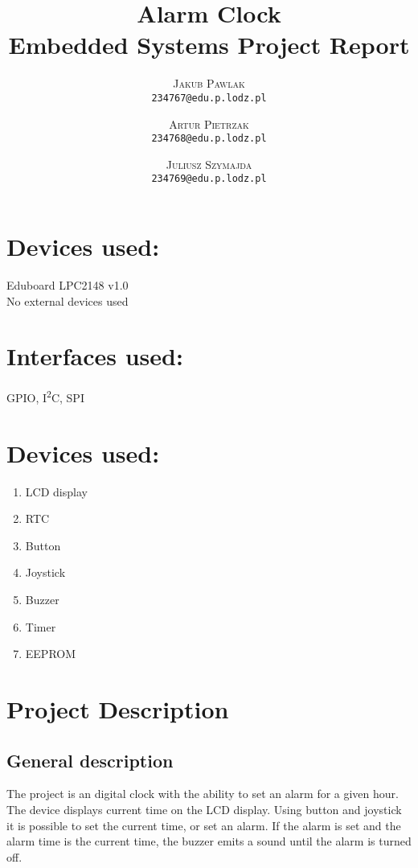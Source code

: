 \documentclass[10pt]{article}
\title{\huge\bf\vspace{-1em} Alarm Clock \\ Embedded Systems Project Report\\\vspace{2em}{\large\normalfont Monday 10:00 lab} }
\author{
    \textsc{Jakub Pawlak} \\
    \texttt{234767@edu.p.lodz.pl}\\
    \and
    \textsc{Artur Pietrzak} \\
    \texttt{234768@edu.p.lodz.pl}\\[1em]
    \and
    \textsc{Juliusz Szymajda} \\
    \texttt{234769@edu.p.lodz.pl}\\
}
\begin{document}
\maketitle
\clearpage
\large
\section*{Devices used:}
Eduboard LPC2148 v1.0 \\[1em]
No external devices used
\section*{Interfaces used:}
GPIO, I\textsuperscript{2}C, SPI
\section*{Devices used:}
\begin{enumerate}
	\item LCD display
	\item RTC
	\item Button
	\item Joystick
	\item Buzzer
	\item Timer
	\item EEPROM
\end{enumerate}
\clearpage
\tableofcontents
{}
\clearpage

\section{Project Description}
\subsection{General description}
The project is an digital clock with the ability to set an alarm for a given hour.
The device displays current time on the LCD display.
Using button and joystick it is possible to set the current time, or set an alarm.
If the alarm is set and the alarm time is the current time, the buzzer emits a sound until the alarm is turned off.
\end{document}
